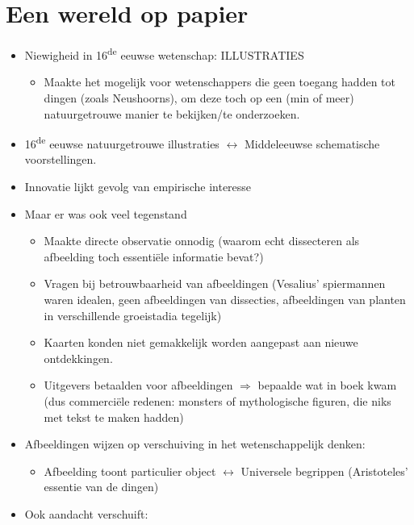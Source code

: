 \documentclass{article}
\begin{document}
  \newpage
  \section{Een wereld op papier}
  \begin{itemize}
    \item Niewigheid in 16\textsuperscript{de} eeuwse wetenschap: ILLUSTRATIES
    \begin{itemize}
      \item Maakte het mogelijk voor wetenschappers die geen toegang hadden tot dingen (zoals Neushoorns), om deze toch op een (min of meer) natuurgetrouwe manier te bekijken/te onderzoeken.
    \end{itemize}
    \item 16\textsuperscript{de} eeuwse natuurgetrouwe illustraties $\leftrightarrow$ Middeleeuwse schematische voorstellingen.
    \item Innovatie lijkt gevolg van empirische interesse
    \item Maar er was ook veel tegenstand
    \begin{itemize}
      \item Maakte directe observatie onnodig (waarom echt dissecteren als afbeelding toch essenti\"ele informatie bevat?)
      \item Vragen bij betrouwbaarheid van afbeeldingen (Vesalius' spiermannen waren idealen, geen afbeeldingen van dissecties, afbeeldingen van planten in verschillende groeistadia tegelijk)
      \item Kaarten konden niet gemakkelijk worden aangepast aan nieuwe ontdekkingen.
      \item Uitgevers betaalden voor afbeeldingen $\Rightarrow$ bepaalde wat in boek kwam (dus commerci\"ele redenen: monsters of mythologische figuren, die niks met tekst te maken hadden)
    \end{itemize}
    \item Afbeeldingen wijzen op verschuiving in het wetenschappelijk denken:
    \begin{itemize}
      \item Afbeelding toont particulier object $\leftrightarrow$ Universele begrippen (Aristoteles' essentie van de dingen)
    \end{itemize}
    \item Ook aandacht verschuift:

\end{itemize}
\end{document}
